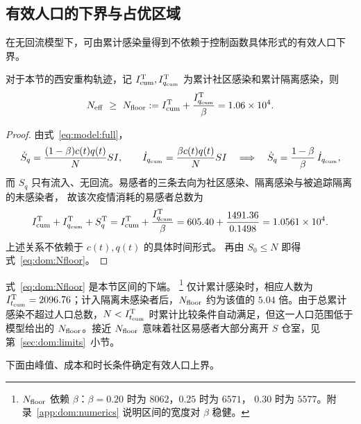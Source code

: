 \documentclass[lang=cn,a4paper,newtx]{elegantpaper}
\numberwithin{equation}{section}
\theoremstyle{plain}
\newcommand{\Itcum}{I_{t_{\mathrm{cum}}}}
\begin{document}
\subsection{有效人口的下界与占优区域}
\label{sec:dom:region}

在无回流模型下，可由累计感染量得到不依赖于控制函数具体形式的有效人口下界。

\begin{proposition}\label{prop:dom:floor}
对于本节的西安重构轨迹，记 $I_{\rm cum}^{\rm T},I_{q_{\rm cum}}^{\rm T}$ 为累计社区感染和累计隔离感染，则
\begin{equation}
  N_{\rm eff}\ \ge\ N_{\rm floor}
  :=I_{\rm cum}^{\rm T}+\frac{I_{q_{\rm cum}}^{\rm T}}{\beta}
  =1.06\times10^{4}.
  \label{eq:dom:Nfloor}
\end{equation}
\end{proposition}
\begin{proof}
由式~\eqref{eq:model:full}，
\[
  \dot S_q=\frac{(1-\beta)c(t)q(t)}{N}SI,
  \qquad
  \dot I_{q_{\rm cum}}=\frac{\beta c(t)q(t)}{N}SI
  \quad\Longrightarrow\quad
  \dot S_q=\frac{1-\beta}{\beta}\,\dot I_{q_{\rm cum}},
\]
而 $S_q$ 只有流入、无回流。易感者的三条去向为社区感染、隔离感染与被追踪隔离的未感染者，
故该次疫情消耗的易感者总数为
\begin{equation}
  I_{\rm cum}^{\rm T}+I_{q_{\rm cum}}^{\rm T}+S_q^{\rm T}
  =I_{\rm cum}^{\rm T}+\frac{I_{q_{\rm cum}}^{\rm T}}{\beta}
  =605.40+\frac{1491.36}{0.1498}
  =1.0561\times10^{4}.
  \label{eq:dom:Sconsumed}
\end{equation}
上述关系不依赖于 $c(t),q(t)$ 的具体时间形式。
再由 $S_0\le N$ 即得式~\eqref{eq:dom:Nfloor}。
\end{proof}

式~\eqref{eq:dom:Nfloor} 是本节区间的下端。%
\footnote{$N_{\rm floor}$ 依赖 $\beta$：$\beta=0.20$ 时为 $8062$，$0.25$ 时为 $6571$，
$0.30$ 时为 $5577$。附录~\ref{app:dom:numerics} 说明区间的宽度对 $\beta$ 稳健。}
仅计累计感染时，相应人数为 $\Itcum^{\rm T}=2096.76$；计入隔离未感染者后，$N_{\rm floor}$ 约为该值的 $5.04$ 倍。由于总累计感染不超过人口总数，$N<\Itcum^{\rm T}$ 时累计比较条件自动满足，但这一人口范围低于模型给出的 $N_{\rm floor}$。接近 $N_{\rm floor}$ 意味着社区易感者大部分离开 $S$ 仓室，见第~\ref{sec:dom:limits}~小节。

下面由峰值、成本和时长条件确定有效人口上界。
\end{document}
